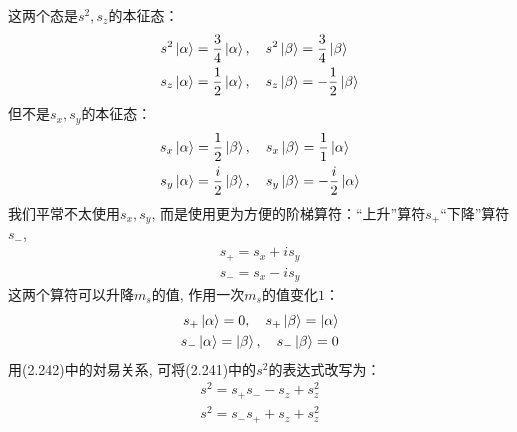 这两个态是$s^2,s_z$的本征态：
\begin{subequations}
	\begin{align}
	s^2\Ket{\alpha} & = \frac{3}{4}\Ket{\alpha},\quad s^2\Ket{\beta} = \frac{3}{4}\Ket{\beta}\\
	s_z\Ket{\alpha} & =\frac{1}{2}\Ket{\alpha},\quad s_z\Ket{\beta} = -\frac{1}{2}\Ket{\beta}
	\end{align}
\end{subequations}
但不是$s_x,s_y$的本征态：
\begin{subequations}
	\begin{align}
	s_x\Ket{\alpha} & = \frac{1}{2}\Ket{\beta},\quad s_x\Ket{\beta} = \frac{1}{1}\Ket{\alpha}\\
	s_y\Ket{\alpha} & =\frac{i}{2}\Ket{\beta},\quad s_y\Ket{\beta} = -\frac{i}{2}\Ket{\alpha}
	\end{align}
\end{subequations}
我们平常不太使用$s_x,s_y$, 而是使用更为方便的阶梯算符：``上升”算符$s_+$``下降”算符$s_-$,
\begin{subequations}
	\begin{align}
	s_+ = s_x + is_y\\
	s_- = s_x - is_y
	\end{align}
\end{subequations}
这两个算符可以升降$m_s$的值, 作用一次$m_s$的值变化$1$：
\begin{subequations}
	\begin{align}
	s_+\Ket{\alpha} = 0,\quad s_+\Ket{\beta} = \Ket{\alpha}\\
	s_-\Ket{\alpha} = \Ket{\beta},\quad s_-\Ket{\beta} = 0\\
	\end{align}
\end{subequations}
用(2.242)中的対易关系, 可将(2.241)中的$s^2$的表达式改写为：
\begin{subequations}
	\begin{align}
	s^2 = s_+s_- - s_z + s_z^2\\
	s^2 = s_-s_+ + s_z + s_z^2 
	\end{align}
\end{subequations}

